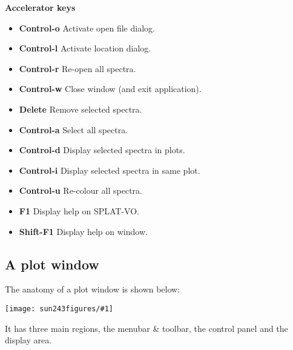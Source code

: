 \documentclass[twoside,11pt]{article}
\newcommand{\htmladdimg}[1]{}
\newcommand{\latexhtml}[2]{#1}
\newcommand{\xlabel}[1]{}
\renewcommand{\_}{\texttt{\symbol{95}}}
\newcommand{\SPLAT}{\textsf{SPLAT-VO}}
\newcommand{\mainfigure}[1]
{\begin{center}
 \latexhtml{\texttt{[image: sun243\_figures/\#1]}}{\htmladdimg{#1.gif}}
 \end{center}
}
\newcommand{\labelitem}[1]{\textbf{#1}}
\newcommand{\subheading}[1]{\textbf{\large{#1}}}
\begin{document}
\subheading{Accelerator keys}

\begin{itemize}
\item \labelitem{Control-o} Activate open file dialog.
\item \labelitem{Control-l} Activate location dialog.
\item \labelitem{Control-r} Re-open all spectra.
\item \labelitem{Control-w} Close window (and exit application).
\item \labelitem{Delete} Remove selected spectra.
\item \labelitem{Control-a} Select all spectra.
\item \labelitem{Control-d} Display selected spectra in plots.
\item \labelitem{Control-i} Display selected spectra in same plot.
\item \labelitem{Control-u} Re-colour all spectra.
\item \labelitem{F1} Display help on \SPLAT.
\item \labelitem{Shift-F1} Display help on window.
\end{itemize}

\newpage
\subsection{A plot window\xlabel{plot_window}}

The anatomy of a plot window is shown below:

\mainfigure{plot3}

It has three main regions, the menubar \& toolbar, the control panel and
the display area.\\
\end{document}
